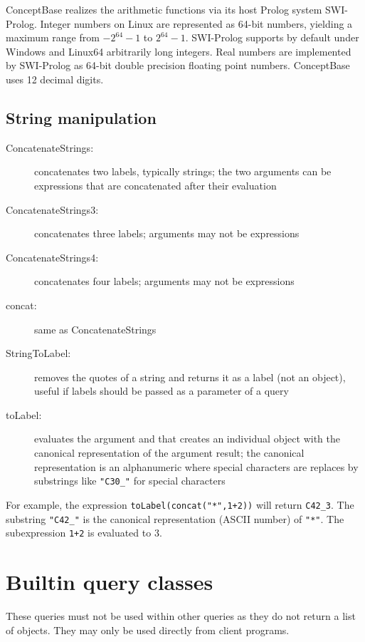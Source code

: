 ConceptBase realizes the arithmetic functions via its host Prolog system SWI-Prolog. 
Integer numbers on Linux are represented 
as 64-bit numbers, yielding a maximum range from $-2^{64}-1$
to $2^{64}-1$. SWI-Prolog supports by default under           
Windows and Linux64 arbitrarily long integers.
Real numbers are implemented by SWI-Prolog as 64-bit double precision
floating point numbers. ConceptBase uses 12 decimal digits.

\subsection{String manipulation}
\begin{description}
\item[ConcatenateStrings:] concatenates two labels, typically strings; the two arguments
  can be expressions that are concatenated after their evaluation
\item[ConcatenateStrings3:] concatenates three labels; arguments may not be expressions
\item[ConcatenateStrings4:] concatenates four labels; arguments may not be expressions
\item[concat:] same as ConcatenateStrings
\item[StringToLabel:] removes the quotes of a string and returns it as a label (not
an object), useful if labels should be passed as a parameter of a query
\item[toLabel:] evaluates the argument and that creates an individual object with
  the canonical representation of the argument result; the canonical representation is
  an alphanumeric where special characters are replaces by substrings like {\tt "C30\_"}
  for special characters
\end{description}

For example, the expression {\tt toLabel(concat("*",1+2))} will return
{\tt C42\_3}. The substring {\tt "C42\_"} is the canonical representation (ASCII number)
of {\tt "*"}. The subexpression {\tt 1+2}  is evaluated to 3.

\section{Builtin query classes}

These queries must not be used within other queries as they do not return
a list of objects. They may only be used directly from client programs.

